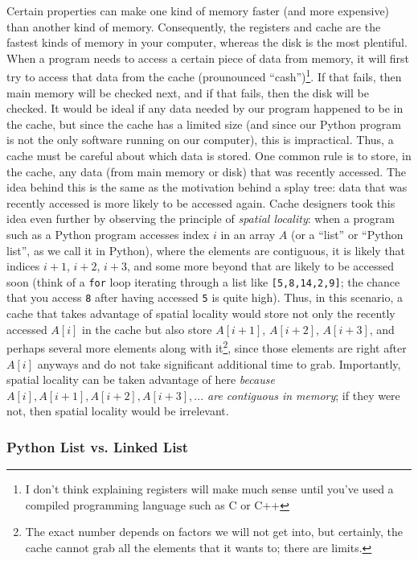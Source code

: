 \documentclass{article}
\begin{document}
Certain properties can make one kind of memory faster (and more expensive) than another kind of memory. Consequently, the registers and cache are the fastest kinds of memory in your computer, whereas the disk is the most plentiful. When a program needs to access a certain piece of data from memory, it will first try to access that data from the cache (prounounced ``cash'')\footnote{I don't think explaining registers will make much sense until you've used a compiled programming language such as C or C++}. If that fails, then main memory will be checked next, and if that fails, then the disk will be checked. It would be ideal if any data needed by our program happened to be in the cache, but since the cache has a limited size (and since our Python program is not the only software running on our computer), this is impractical. Thus, a cache must be careful about which data is stored. One common rule is to store, in the cache, any data (from main memory or disk) that was recently accessed. The idea behind this is the same as the motivation behind a splay tree: data that was recently accessed is more likely to be accessed again. Cache designers took this idea even further by observing the principle of \textit{spatial locality}: when a program such as a Python program accesses index $i$ in an array $A$ (or a ``list'' or ``Python list'', as we call it in Python), where the elements are contiguous, it is likely that indices $i + 1$, $i + 2$, $i + 3$, and some more beyond that are likely to be accessed soon (think of a \lstinline{for} loop iterating through a list like \lstinline{[5,8,14,2,9]}; the chance that you access \lstinline{8} after having accessed \lstinline{5} is quite high). Thus, in this scenario, a cache that takes advantage of spatial locality would store not only the recently accessed $A[i]$ in the cache but also store $A[i + 1]$, $A[i + 2]$, $A[i + 3]$, and perhaps several more elements along with it\footnote{The exact number depends on factors we will not get into, but certainly, the cache cannot grab all the elements that it wants to; there are limits.}, since those elements are right after $A[i]$ anyways and do not take significant additional time to grab. Importantly, spatial locality can be taken advantage of here \textit{because $A[i], A[i+1], A[i+2], A[i+3], ...$ are contiguous in memory}; if they were not, then spatial locality would be irrelevant.

\subsubsection{Python List vs. Linked List}
\end{document}
